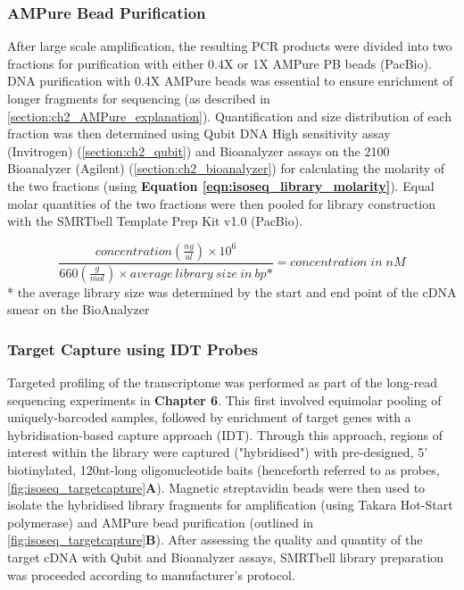 \subsubsection{AMPure Bead Purification} 
\label{section:ch2_ampurebead_pool} 
After large scale amplification, the resulting PCR products were divided into two fractions for purification with either 0.4X or 1X AMPure PB beads (PacBio). DNA purification with 0.4X AMPure beads was essential to ensure enrichment of longer fragments for sequencing (as described in \cref{section:ch2_AMPure_explanation}). Quantification and size distribution of each fraction was then determined using Qubit DNA High sensitivity assay (Invitrogen) (\cref{section:ch2_qubit}) and Bioanalyzer assays on the 2100 Bioanalyzer (Agilent) (\cref{section:ch2_bioanalyzer}) for calculating the molarity of the two fractions (using \textbf{Equation \ref{eqn:isoseq_library_molarity}}). Equal molar quantities of the two fractions were then pooled for library construction with the SMRTbell Template Prep Kit v1.0 (PacBio). 

\begin{equation}
	\label{eqn:isoseq_library_molarity}
	\frac{concentration(\frac{ng}{ul})\times 10^6}{660(\frac{g}{mol}) \times average\:library\:size\:in\:bp\mbox{*}} = concentration\;in\; nM
\end{equation}
* the average library size was determined by the start and end point of the cDNA smear on the BioAnalyzer

\subsubsection{Target Capture using IDT Probes} 
\label{section:ch2_targetcapture_explanation} 
Targeted profiling of the transcriptome was performed as part of the long-read sequencing experiments in \textbf{Chapter 6}. This first involved equimolar pooling of uniquely-barcoded samples, followed by enrichment of target genes with a hybridisation-based capture approach (IDT). Through this approach, regions of interest within the library were captured ("hybridised") with pre-designed, 5’ biotinylated, 120nt-long oligonucleotide baits (henceforth referred to as probes, \cref{fig:isoseq_targetcapture}\textbf{A}). Magnetic streptavidin beads were then used to isolate the hybridised library fragments for amplification (using Takara Hot-Start polymerase) and AMPure bead purification (outlined in \cref{fig:isoseq_targetcapture}\textbf{B}). After assessing the quality and quantity of the target cDNA with Qubit and Bioanalyzer assays, SMRTbell library preparation was proceeded according to manufacturer's protocol.  

